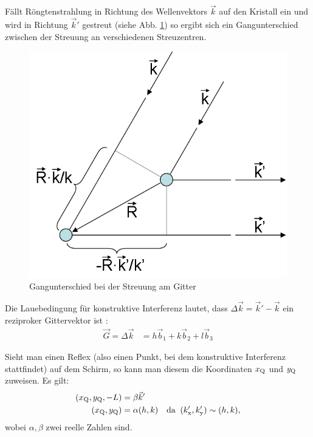 Fällt Röngtenstrahlung in Richtung des Wellenvektors $\vec{k}$ auf den Kristall ein und wird in Richtung $\vec{k}'$ gestreut (siehe Abb. \ref{fig:laue_bed}) so ergibt sich ein Gangunterschied zwischen der Streuung an verschiedenen Streuzentren. 

\begin{figure}[h]
\centering
\includegraphics[scale=0.75]{data/laue/Laue-Bedingung.png}
\caption{Gangunterschied bei der Streuung am Gitter \cite{wiki_laue_bed}}
\label{fig:laue_bed}
\end{figure}

Die Lauebedingung für konstruktive Interferenz lautet, dass $\Delta \vec{k} = \vec{k}'-\vec{k}$ ein reziproker Gittervektor ist \cite{wiki_laue_bed}:
\begin{align*}
\vec{G} = \Delta \vec{k} &= h\vec{b}_1 + k\vec{b}_2 + l\vec{b}_3
\end{align*}

Sieht man einen Reflex (also einen Punkt, bei dem konstruktive Interferenz stattfindet) auf dem Schirm, so kann man diesem die Koordinaten $x_\mathrm{Q}$ und $y_\mathrm{Q}$ zuweisen. Es gilt:
\begin{align}
(x_\mathrm{Q}, y_\mathrm{Q},-L) &= \beta \vec{k}' \label{eq:kprime} \\
(x_\mathrm{Q}, y_\mathrm{Q}) &= \alpha (h,k) & \text{da}\;\;(k_\mathrm{x}',k_\mathrm{y}') \sim (h,k), \nonumber
\end{align}
wobei $\alpha, \beta$ zwei reelle Zahlen sind.


